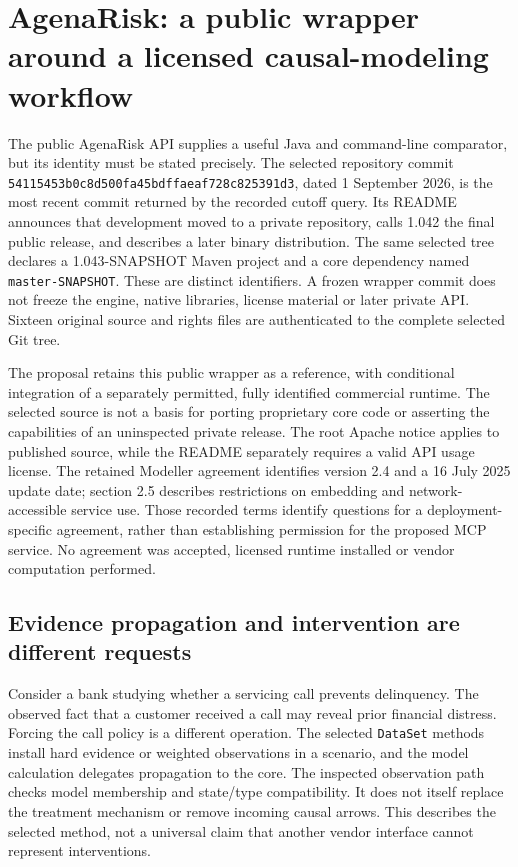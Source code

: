 \section{AgenaRisk: a public wrapper around a licensed causal-modeling workflow}
\label{sec:exec25-agena-reuse}
The public AgenaRisk API supplies a useful Java and command-line comparator,
but its identity must be stated precisely. The selected repository commit
\texttt{54115453b0c8d500fa45}\allowbreak\texttt{bdffaeaf728c825391d3},
dated 1 September 2026, is the most recent commit returned by the recorded
cutoff query. Its README announces that development moved to a private
repository, calls 1.042 the final public release, and describes a later binary
distribution. The same selected tree declares a 1.043-SNAPSHOT Maven project
and a core dependency named \texttt{master-SNAPSHOT}. These are distinct
identifiers. A frozen wrapper commit does not freeze the engine, native
libraries, license material or later private API. Sixteen original source
and rights files are authenticated to the complete selected Git tree.
\citep{exec25_agena_source}

The proposal retains this public wrapper as a reference, with conditional
integration of a separately permitted, fully identified commercial runtime.
The selected source is not a basis for porting proprietary core code or
asserting the capabilities of an uninspected private release. The root
Apache notice applies to published source, while the README separately
requires a valid API usage license. The retained Modeller agreement identifies
version 2.4 and a 16 July 2025 update date; section 2.5 describes restrictions
on embedding and network-accessible service use. Those recorded terms identify
questions for a deployment-specific agreement, rather than establishing
permission for the proposed MCP service. No agreement was accepted, licensed
runtime installed or vendor computation performed.\citep{exec25_agena_source,exec25_agena_choice}

\subsection{Evidence propagation and intervention are different requests}
Consider a bank studying whether a servicing call prevents delinquency. The
observed fact that a customer received a call may reveal prior financial
distress. Forcing the call policy is a different operation. The selected
\texttt{DataSet} methods install hard evidence or weighted observations in a
scenario, and the model calculation delegates propagation to the core. The
inspected observation path checks model membership and state/type compatibility.
It does not itself replace the treatment mechanism or remove incoming causal
arrows. This describes the selected method, not a universal claim that another
vendor interface cannot represent interventions.\citep{exec25_agena_source}


